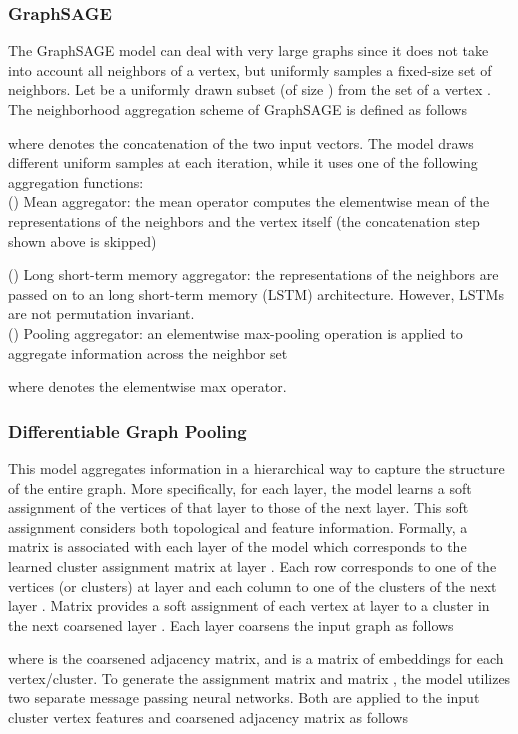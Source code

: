 \documentclass[twoside,11pt]{article}
\begin{document}
\subsubsection{GraphSAGE}
The GraphSAGE  model can deal with very large graphs since it does not take into account all neighbors of a vertex, but uniformly samples a fixed-size set of neighbors.
Let  be a uniformly drawn subset (of size ) from the set  of a vertex .
The neighborhood aggregation scheme of GraphSAGE is defined as follows

where  denotes the concatenation of the two input vectors.
The model draws different uniform samples at each iteration, while it uses one of the following aggregation functions:\\
\noindent() Mean aggregator: the mean operator computes the elementwise mean of the representations of the neighbors and the vertex itself (the concatenation step shown above is skipped)

\noindent() Long short-term memory aggregator: the representations of the neighbors are passed on to an long short-term memory (LSTM) architecture.
However, LSTMs are not permutation invariant.\\
\noindent() Pooling aggregator: an elementwise max-pooling operation is applied to aggregate information across the neighbor set

where  denotes the elementwise max operator.


\subsubsection{Differentiable Graph Pooling}
This model aggregates information in a hierarchical way to capture the structure of the entire graph.
More specifically, for each layer, the model learns a soft assignment of the vertices of that layer to those of the next layer.
This soft assignment considers both topological and feature information.
Formally, a matrix  is associated with each layer of the model which corresponds to the learned cluster assignment matrix at layer .
Each row corresponds to one of the  vertices (or clusters) at layer  and each column to one of the  clusters of the next layer .
Matrix  provides a soft assignment of each vertex at layer  to a cluster in the next coarsened layer .
Each layer coarsens the input graph as follows

where  is the coarsened adjacency matrix, and  is a matrix of embeddings for each vertex/cluster.
To generate the assignment matrix  and matrix , the model utilizes two separate message passing neural networks.
Both are applied to the input cluster vertex features  and coarsened adjacency matrix  as follows
\end{document}
